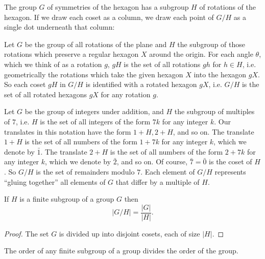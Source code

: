 \begin{example}
The group \(G\) of symmetries of the hexagon has a subgroup \(H\) of rotations of the hexagon.
If we  draw each coset as a column, we draw each point of \(G/H\) as a single dot underneath that column:
\begin{center}

\end{center}
\end{example}
\begin{example}
Let \(G\) be the group of all rotations of the plane and \(H\) the subgroup of those rotations which preserve a regular hexagon \(X\) around the origin.
For each angle \(\theta\), which we think of as a rotation \(g\), \(gH\) is the set of all rotations \(gh\) for \(h \in H\), i.e. geometrically the rotations which take the given hexagon \(X\) into the hexagon \(gX\).
So each coset \(gH\) in \(G/H\) is identified with a rotated hexagon \(gX\), i.e. \(G/H\) is the set of all rotated hexagons \(gX\) for any rotation \(g\).
\end{example}
\begin{example}
Let \(G\) be the group of integers under addition, and \(H\) the subgroup of multiples of \(7\), i.e. \(H\) is the set of all integers of the form \(7k\) for any integer \(k\).
Our translates in this notation have the form \(1+H, 2+H\), and so on.
The translate \(1+H\) is the set of all numbers of the form \(1+7k\) for any integer \(k\), which we denote by \(\bar{1}\).
The translate \(2+H\) is the set of all numbers of the form \(2+7k\) for any integer \(k\), which we denote by \(\bar{2}\), and so on.
Of course, \(\bar{7}=\bar{0}\) is the coset of \(H\).
So \(G/H\) is the set of remainders modulo \(7\).
Each element of \(G/H\) represents ``gluing together'' all elements of \(G\) that differ by a multiple of \(H\).
\end{example}

\begin{theorem}[Lagrange]
If \(H\) is a finite subgroup of a group \(G\) then
\[
|G/H|=\frac{|G|}{|H|}.
\]
\end{theorem}
\begin{proof}
The set \(G\) is divided up into disjoint cosets, each of size \(|H|\).
\end{proof}


\begin{corollary}
The order of any finite subgroup of a group divides the order of the group.
\end{corollary}


